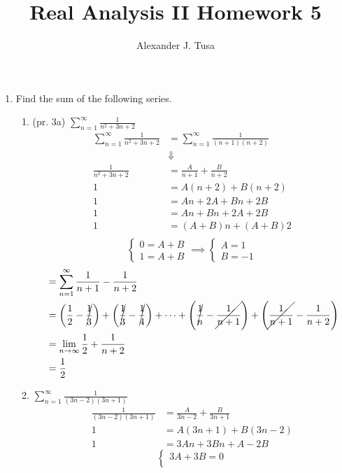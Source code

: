 \documentclass[12pt,letterpaper]{article}
\author{Alexander J. Tusa}
\title{Real Analysis II Homework 5}
\newcommand{\limx}[2]{\displaystyle\lim\limits_{#1 \to #2}}
\theoremstyle{case}
\theoremstyle{definition}
\begin{document}
	\maketitle
	\begin{enumerate}
		\item Find the sum of the following series.
		\begin{enumerate}
			\item (pr. 3a) $\displaystyle\sum_{n=1}^{\infty} \frac{1}{n^2+3n+2}$
			\begin{align*}
				\sum_{n=1}^{\infty} \frac{1}{n^2+3n+2} &= \sum_{n=1}^{\infty} \frac{1}{(n+1)(n+2)} \\
				&\Downarrow \\
				\frac{1}{n^2+3n+2}&=\frac{A}{n+1} + \frac{B}{n+2} \\
				1&=A(n+2)+ B(n+2) \\
				1&=An+2A+Bn+2B \\
				1&=An+Bn+2A+2B \\
				1&= (A+B)n+(A+B)2 \\
			\end{align*}
			\[\begin{cases}
			0=A+B \\
			1=A+B
			\end{cases} \implies
			\begin{cases}
			A=1 \\
			B=-1
			\end{cases}\]
			\begin{align*}
				&=\sum_{n=1}^{\infty} \frac{1}{n+1}-\frac{1}{n+2} \\
				&= \left(\frac{1}{2}-\cancel{\frac{1}{3}}\right) + \left(\cancel{\frac{1}{3}}-\cancel{\frac{1}{4}}\right) + \dots + \left(\cancel{\frac{1}{n}}-\cancel{\frac{1}{n+1}}\right)+ \left(\cancel{\frac{1}{n+1}}-\frac{1}{n+2}\right) \\
				&= \limx{n}{\infty} \frac{1}{2}+\frac{1}{n+2} \\
				&= \frac{1}{2}
			\end{align*}
			\item $\displaystyle\sum_{n=1}^{\infty} \frac{1}{(3n-2)(3n+1)}$
			\begin{align*}
				\frac{1}{(3n-2)(3n+1)} &= \frac{A}{3n-2} + \frac{B}{3n+1} \\
				1&= A(3n+1)+B(3n-2) \\
				1&= 3An+3Bn+A-2B
			\end{align*}
			\[\begin{cases}
			3A+3B=0 \\

\end{cases}\]
\end{enumerate}
\end{enumerate}
\end{document}
